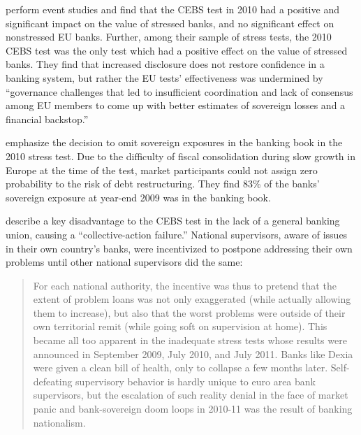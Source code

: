 \documentclass[12pt]{article}
\begin{document}
\citet{Candelon} perform event studies and find that the CEBS test in 2010 had a positive and significant impact on the value of stressed banks, and no significant effect on nonstressed EU banks. Further, among their sample of stress tests, the 2010 CEBS test was the only test which had a positive effect on the value of stressed banks. They find that increased disclosure does not restore confidence in a banking system, but rather the EU tests' effectiveness was undermined by ``governance challenges that led to insufficient coordination and lack of consensus among EU members to come up with better estimates of sovereign losses and a financial backstop.''

\citet{OECD} emphasize the decision to omit sovereign exposures in the banking book in the 2010 stress test. Due to the difficulty of fiscal consolidation during slow growth in Europe at the time of the test, market participants could not assign zero probability to the risk of debt restructuring. They find 83\% of the banks' sovereign exposure at year-end 2009 was in the banking book.

\citet{Posen} describe a key disadvantage to the CEBS test in the lack of a general banking union, causing a ``collective-action failure.'' National supervisors, aware of issues in their own country's banks, were incentivized to postpone addressing their own problems until other national supervisors did the same:

\begin{quote}
For each national authority, the incentive was thus to pretend that the extent of problem loans was not only exaggerated (while actually allowing them to increase), but also that the worst problems were outside of their own territorial remit (while going soft on supervision at home). This became all too apparent in the inadequate stress tests whose results were announced in September 2009, July 2010, and July 2011. Banks like Dexia were given a clean bill of health, only to collapse a few months later. Self-defeating supervisory behavior is hardly unique to euro area bank supervisors, but the escalation of such reality denial in the face of market panic and bank-sovereign doom loops in 2010-11 was the result of banking nationalism.
\end{quote}

\newpage
{}


\nocite{*}

\end{document}
